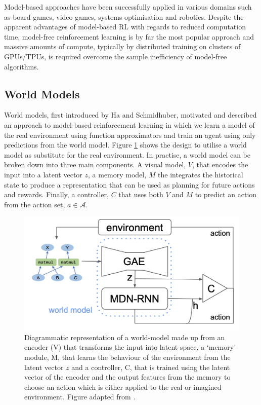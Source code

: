 Model-based approaches have been successfully applied in various domains such as board games, video games, systems optimisation and robotics. Despite the apparent advantages of model-based RL with regards to reduced computation time, model-free reinforcement learning is by far the most popular approach and massive amounts of compute, typically by distributed training on clusters of GPUs/TPUs, is required overcome the sample inefficiency of model-free algorithms.

\subsection{World Models}
World models, first introduced by Ha and Schmidhuber, motivated and described an approach to model-based reinforcement learning in which we learn a model of the real environment using function approximators and train an agent using only predictions from the world model. Figure \ref{fig:bg:mb-rl} shows the design to utilise a world model as substitute for the real environment. In practise, a world model can be broken down into three main components. A visual model, $V$, that encodes the input into a latent vector $z$, a memory model, $M$ the integrates the historical state to produce a representation that can be used as planning for future actions and rewards. Finally, a controller, $C$ that uses both $V$ and $M$ to predict an action from the action set, $a \in \mathcal{A}$.

\begin{figure}[ht]
  \centering
  \includegraphics[width=0.75\columnwidth]{sections/2background/images/mb-rl.png}
  \caption[Model-based Reinforcement Learning End-To-End System]{Diagrammatic representation of a world-model made up from an encoder (V) that transforms the input into latent space, a `memory' module, M, that learns the behaviour of the environment from the latent vector $z$ and a controller, C, that is trained using the latent vector of the encoder and the output features from the memory to choose an action which is either applied to the real or imagined environment. Figure adapted from \cite{ha2018worldmodels}.}
  \label{fig:bg:mb-rl}
\end{figure}

